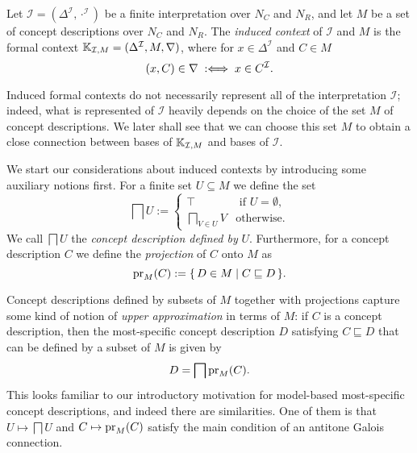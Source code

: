 \begin{Definition}
  \label{def:induced-context}
  Let $\mathcal{I} = (\Delta^{\mathcal{I}}, \cdot^{\mathcal{I}})$ be a finite
  interpretation over $N_C$ and $N_R$, and let $M$ be a set of concept descriptions over
  $N_C$ and $N_R$.  The \emph{induced context} of $\mathcal{I}$ and $M$ is the formal
  context ${\mathbb{K}}_{\mathcal{I}, M} = (\Delta^{\mathcal{I}}, M, \nabla)$, where for $x \in
  \Delta^{\mathcal{I}}$ and $C \in M$
  \begin{equation*}
    (x, C) \in \nabla \;:\Longleftrightarrow\; x \in C^{\mathcal{I}}.
  \end{equation*}  
\end{Definition}

Induced formal contexts do not necessarily represent all of the interpretation
$\mathcal{I}$; indeed, what is represented of $\mathcal{I}$ heavily depends on the choice
of the set $M$ of concept descriptions.  We later shall see that we can choose this set
$M$ to obtain a close connection between bases of ${\mathbb{K}}_{\mathcal{I}, M}$ and bases of
$\mathcal{I}$.

We start our considerations about induced contexts by introducing some auxiliary notions
first.  For a finite set $U \subseteq M$ we define the set
\begin{equation*}
  \bigsqcap U :=
  \begin{cases}
    \top & \text{ if } U = \emptyset, \\
    \bigsqcap_{V \in U} V & \text{otherwise}.
  \end{cases}
\end{equation*}
We call $\bigsqcap U$ the \emph{concept description defined by} $U$.  Furthermore, for a
concept description $C$ we define the \emph{projection} of $C$ onto $M$ as
\begin{equation*}
  \operatorname{pr}_M(C) := {\{\, D \in M \mid C \sqsubseteq D \,\}}.
\end{equation*}

Concept descriptions defined by subsets of $M$ together with projections capture some kind
of notion of \emph{upper approximation} in terms of $M$: if $C$ is a concept description,
then the most-specific concept description $D$ satisfying $C \sqsubseteq D$ that can be
defined by a subset of $M$ is given by
\begin{equation*}
  D = \bigsqcap \operatorname{pr}_M(C).
\end{equation*}
This looks familiar to our introductory motivation for model-based most-specific concept
descriptions, and indeed there are similarities.  One of them is that $U \mapsto \bigsqcap
U$ and $C \mapsto \operatorname{pr}_M(C)$ satisfy the main condition of an antitone Galois connection.

